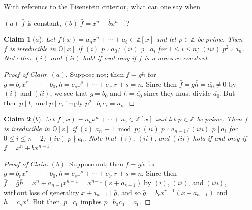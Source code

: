 \documentclass[12pt]{article}
\newtheorem*{claim}{Claim}
\theoremstyle{remark}
\begin{document}
\setcounter{subsubsection}{14}
\begin{problem}
  With reference to the Eisenstein criterion, what can one say when
  \par \noindent $(a)$ $\bar{f}$ is constant, $(b)$ $\bar{f} = x^n+\bar{b}x^{n-1}$?
\end{problem}
\begin{claim}[$a$]
  Let $f(x) = a_nx^n + \cdots + a_0 \in \mathbb{Z}[x]$ and let $p \in \mathbb{Z}$ be prime. Then $f$ is irreducible in $\mathbb{Q}[x]$ if $(i)$ $p \nmid a_0$; $(ii)$ $p \mid a_i$ for $1 \le i \le n$; $(iii)$ $p^2 \nmid a_n$. Note that $(i)$ and $(ii)$ hold if and only if $\bar{f}$ is a nonzero constant.
\end{claim}
\begin{proof}[Proof of Claim $(a)$]
  Suppose not; then $f = gh$ for $g = b_rx^r + \cdots + b_0, h = c_sx^s + \cdots + c_0, r + s = n$. Since then $\bar{f} = \bar{g}\bar{h} = \overline{a_0} \ne 0$ by $(i)$ and $(ii)$, we see that $\bar{g} = \overline{b_0}$ and $\bar{h} = \overline{c_0}$ since they must divide $\overline{a_0}$. But then $p \mid b_r$ and $p \mid c_s$ imply $p^2 \mid b_rc_s = a_n$.
\end{proof}
\begin{claim}[$b$]
  Let $f(x) = a_nx^n + \cdots + a_0 \in \mathbb{Z}[x]$ and let $p \in \mathbb{Z}$ be prime. Then $f$ is irreducible in $\mathbb{Q}[x]$ if $(i)$ $a_n \equiv 1 \bmod p$; $(ii)$ $p \nmid a_{n-1}$; $(iii)$ $p \mid a_i$ for $0 \le i \le n-2$; $(iv)$ $p \nmid a_0$. Note that $(i)$, $(ii)$, and $(iii)$ hold if and only if $\bar{f} = x^n+\bar{b}x^{n-1}$.
\end{claim}
\begin{proof}[Proof of Claim $(b)$]
  Suppose not; then $f = gh$ for $g = b_rx^r + \cdots + b_0, h = c_sx^s + \cdots + c_0, r + s = n$. Since then $\bar{f} = \bar{g}\bar{h} = x^n + \overline{a_{n-1}}x^{n-1} = x^{n-1}(x + \overline{a_{n-1}})$ by $(i)$, $(ii)$, and $(iii)$, without loss of generality $x + \overline{a_{n-1}} \mid \bar{g}$, and so $\bar{g} = \overline{b_r}x^{r-1}(x + \overline{a_{n-1}})$ and $\bar{h} = \overline{c_s}x^s$. But then, $p \mid c_0$ implies $p \mid b_0c_0 = a_0$.
\end{proof}
\end{document}
